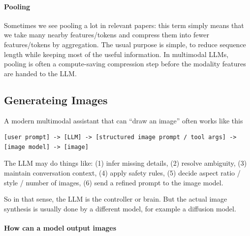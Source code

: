 \documentclass[11pt]{article}  %
\begin{document}
\paragraph{Pooling}
Sometimes we see pooling a lot in relevant papers: this term simply means that we take many nearby features/tokens and compress them into fewer features/tokens by aggregation.
The usual purpose is simple, to reduce sequence length while keeping most of the useful information.
In multimodal LLMs, pooling is often a compute-saving compression step before the modality features are handed to the LLM.


\subsection{Generateing Images}

A modern multimodal assistant that can ``draw an image'' often works like this
\begin{lstlisting}
[user prompt] -> [LLM] -> [structured image prompt / tool args] -> [image model] -> [image]
\end{lstlisting}
The LLM may do things like: (1) infer missing details, (2) resolve ambiguity, (3) maintain conversation context, (4) apply safety rules, (5) decide aspect ratio / style / number of images, (6) send a refined prompt to the image model.

So in that sense, the LLM is the controller or brain.
But the actual image synthesis is usually done by a different model, for example a diffusion model.

\paragraph{How can a model output images}
\end{document}
